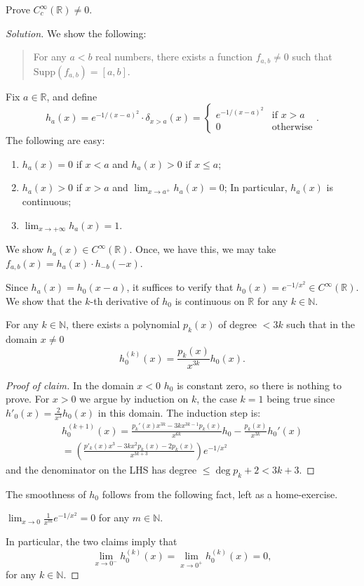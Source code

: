 \documentclass[12pt, draft,reqno,a4paper, twoside]{amsproc}
\newcommand{\supp}{\mathrm{Supp}}
\newcommand{\dbN}{\mathbb N}
\newcommand{\dbR}{\mathbb R}
\begin{document}
\begin{exer}\label{exer:Ccinfty-non-empty}Prove $C_c^\infty(\dbR)\ne 0$.
\end{exer}
\begin{proof}[\it Solution] We show the following:
\begin{quotation}
For any $a<b$ real numbers, there exists a function $f_{a,b}\ne 0$ such that $\supp (f_{a,b})=[a,b]$. 
\end{quotation}

Fix $a\in \dbR$, and define \[h_a(x)=e^{-1/(x-a)^2}\cdot \delta_{x> a}(x)=\begin{cases}e^{-1/(x-a)^2}&\text{if }x> a\\0&\text{otherwise}\end{cases}.\]
The following are easy:
\begin{enumerate}
\item $h_a(x)=0$ if $x<a$ and $h_a(x)>0$ if $x\le a$;
\item $h_a(x)>0$ if $x>a$ and $\lim_{x\to a^+}h_a(x)=0$; In particular, $h_a(x)$ is continuous;
\item $\lim_{x\to +\infty}h_a(x)=1$.
\end{enumerate}
We show $h_a(x)\in C^\infty(\dbR)$. Once, we have this, we may take $f_{a,b}(x)=h_a(x)\cdot h_{-b}(-x)$. 

Since $h_a(x)=h_0(x-a)$, it suffices to verify that $h_0(x)=e^{-1/x^2}\in C^\infty(\dbR)$. We show that the $k$-th derivative of $h_0$ is continuous on $\dbR$ for any $k\in\dbN$. 
\begin{claim} For any $k\in\dbN$, there exists a polynomial $p_k(x)$ of degree $<3k$ such that in the domain $x\ne 0$
\[h_0^{(k)}(x)=\frac{p_k(x)}{x^{3k}}h_0(x).\]
\end{claim}
\begin{proof}[\it Proof of claim]\renewcommand{\qedsymbol}{}
In the domain $x<0$ $h_0$ is constant zero, so there is nothing to prove. For $x>0$ we argue by induction on $k$, the case $k=1$ being true since $h'_0(x)=\frac{2}{x^3}h_0(x)$ in this domain. The induction step is:
\begin{multline*}
h^{(k+1)}_0(x)=\frac{p_k'(x)x^{3k}-3kx^{3k-1}p_k(x)}{x^{6k}}h_0-\frac{p_k(x)}{x^{3k}}h_0'(x)\\
=\left(\frac{p'_k(x)x^3-3kx^2p_k(x)-2p_k(x)}{x^{3k+3}}\right)e^{-1/x^2}
\end{multline*}
and the denominator on the LHS has degree $\le \deg p_k+2<3k+3$. 
\end{proof}
The smoothness of $h_0$ follows from the following fact, left as a home-exercise.
\begin{claim}$\lim_{x\to 0}\frac{1}{x^m}e^{-1/x^2}=0$ for any $m\in\dbN$. 
\end{claim}
In particular, the two claims imply that 
\[\lim_{x\to 0^{-}}h_0^{(k)}(x)=\lim_{x\to 0^{+}}h_0^{(k)}(x)=0,\]
for any $k\in\dbN$. 
\end{proof}
\end{document}

